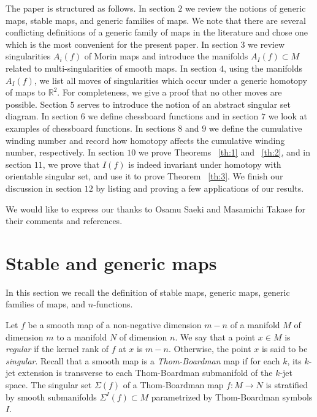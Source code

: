 \documentclass[12pt]{amsart}
\def \R{\mathbb{R}}
\def\co{\colon}
\theoremstyle{definition}
\begin{document}
The paper is structured as follows. In section $2$ we review the notions of generic maps, stable maps, and generic families of maps. We note that there are several conflicting definitions of a generic family of maps in the literature and chose one which is the most convenient for the present paper. In section $3$ we review singularities $A_i(f)$ of Morin maps and introduce the manifolds $A_{I}(f) \subset M$ related to multi-singularities of smooth maps.  In section $4$, using the manifolds $A_I(f)$,  we list all moves of singularities which occur under a generic homotopy of maps to $\R^2$. For completeness,  we give a proof that no other moves are possible.  Section $5$ serves to introduce the notion of an abstract singular set diagram.  In section $6$ we define chessboard functions and in section $7$ we look at examples of chessboard functions.  In sections $8$ and $9$ we define the cumulative winding number and record how homotopy affects the cumulative winding number, respectively.  In section $10$ we prove Theorems ~\ref{th:1} and ~\ref{th:2}, and in section $11$, we prove that $I(f)$ is indeed invariant under homotopy with orientable singular set, and use it to prove  Theorem ~\ref{th:3}. We finish our discussion in section $12$ by listing and proving a few applications of our results. 




We would like to express our thanks to Osamu Saeki and Masamichi Takase for their comments and references. 



\section{Stable and generic maps}\label{s:2}

 In this section we recall the definition of stable maps, generic maps, generic families of maps, and $n$-functions.

Let $f$ be a smooth map of a non-negative dimension $m-n$ of a manifold $M$ of dimension $m$ to a manifold $N$ of dimension $n$. We say that a point $x\in M$ is \emph{regular} if the kernel rank of $f$ at $x$ is $m-n$. Otherwise, the point $x$ is said to be \emph{singular}. 
Recall that a smooth map is a \emph{Thom-Boardman} map if for each $k$,  its $k$-jet extension is transverse to each Thom-Boardman submanifold of the $k$-jet space. 
The singular set $\Sigma(f)$ of a Thom-Boardman map $f\co M\to N$ is stratified by smooth submanifolds $\Sigma^I(f)\subset M$ parametrized by Thom-Boardman symbols $I$. 
\end{document}
